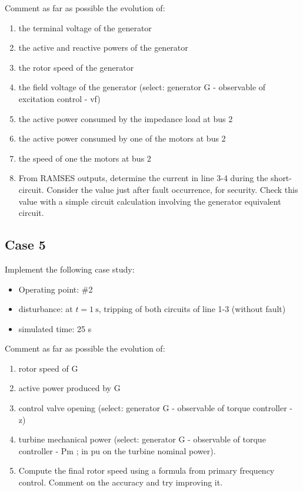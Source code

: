 \documentclass[a4paper,11pt,oneside,onecolumn]{article}
\begin{document}
\noindent Comment as far as possible the evolution of:
\begin{enumerate}
\item the terminal voltage of the generator
\item the active and reactive powers of the generator
\item the rotor speed of the generator
\item the field voltage of the generator (select: generator G - observable of excitation control - vf)
\item the active power consumed by the impedance load at bus 2
\item the active power consumed by one of the motors at bus 2
\item the speed of one the motors at bus 2
\item From RAMSES outputs, determine the current in line 3-4 during the short-circuit. Consider the value just after fault occurrence, for security. Check this value with a simple circuit calculation involving the generator equivalent circuit.
\end{enumerate}

\subsection{Case 5}

Implement the following case study:
\begin{itemize}
\item Operating point: \#2
\item disturbance: at $t=1 \mathrm{~s}$, tripping of both circuits of line 1-3 (without fault)
\item simulated time: 25 s
\end{itemize}

\noindent Comment as far as possible the evolution of:
\begin{enumerate}
\item rotor speed of G
\item active power produced by G
\item control valve opening (select: generator G - observable of torque controller - z)
\item turbine mechanical power (select: generator G - observable of torque controller - Pm ; in pu on the turbine nominal power).	
\item Compute the final rotor speed using a formula from primary frequency control. Comment on the accuracy and try improving it.
\end{enumerate}
\end{document}
